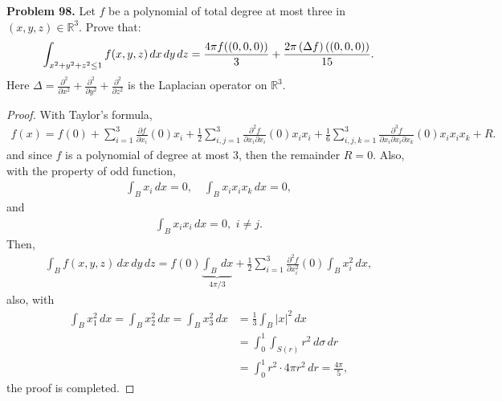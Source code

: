 \documentclass[11pt]{article}
\theoremstyle{definition}
\theoremstyle{definition}
\begin{document}
\medskip


\noindent
{\bf Problem 98.}
Let $f$ be a polynomial of total degree at most three in $(x, y, z) \in \mathbb{R}^3$.  Prove that:
$$
\int_{x^2 + y^2 + z^2 \le 1} f(x, y, z)\hspace{1.5pt} dx\hspace{1.5pt}  dy \hspace{1.5pt} dz =
\frac{4\pi f((0, 0, 0)) }{3} +  \frac{2\pi \left(\Delta f\right)((0, 0, 0))}{15}.
$$
Here $\displaystyle{\Delta =  \frac{\partial^2}{\partial x^2}  +  \frac{\partial^2}{\partial y^2} +
	\frac{\partial^2}{\partial z^2}}$ is the Laplacian operator on $\mathbb{R}^3$.
\begin{proof}
With Taylor's formula, 
\begin{align*}
    f(x) = f(0) + \sum^3_{i=1} \frac{\partial f}{\partial x_i}(0) x_i + \frac{1}{2} \sum^3_{i,j=1} \frac{\partial^2 f}{\partial x_i \partial x_i}(0)x_i x_i + \frac{1}{6} \sum^3_{i,j,k=1} \frac{\partial^3 f}{\partial x_i \partial x_i \partial x_k}(0)x_i x_i x_k + R.
\end{align*}
and since $f$ is a polynomial of degree at most $3$, then the remainder $R = 0$. Also, with the property of odd function,
\begin{align*}
    \int_B x_i\, dx = 0,\quad \int_B x_i x_i x_k\, dx = 0,
\end{align*}
and
\begin{align*}
    \int_B x_i x_i\, dx = 0,\,\, i\neq j.
\end{align*}
Then, 
\begin{align*}
    \int_B f(x, y, z)\, dx\,dy\,dz = f(0) \underbrace{\int_B\, dx}_{4\pi/3}  + \frac{1}{2} \sum^3_{i=1} \frac{\partial^2 f}{\partial x^2_i}(0) \int_B x_i^2\, dx,
\end{align*}
also, with 
\begin{align*}
    \int_B x_1^2\, dx = \int_B x_2^2\, dx = \int_B x_3^2\, dx & = \frac{1}{3} \int_B |x|^2\, dx \\
    & = \int^1_0 \int_{S(r)} r^2\, d\sigma\, dr \\
    & = \int^1_0 r^2 \cdot 4\pi r^2\, dr = \frac{4\pi}{5},
\end{align*}
the proof is completed. 
\end{proof}


\medskip
\end{document}
